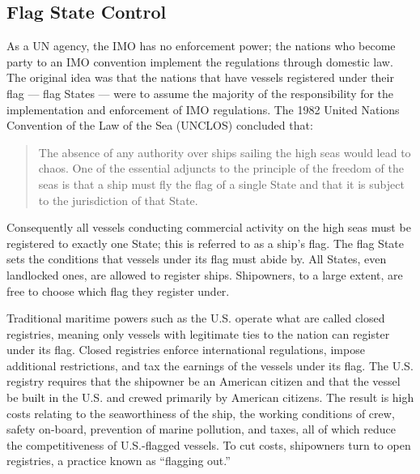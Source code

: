 \documentclass[twoside,symmetric,notoc]{tufte-book}
\begin{document}
\subsection{Flag State Control}
\par{%
As a UN agency, the IMO has no enforcement power; the nations who become party to an IMO convention implement the regulations through domestic law. The original idea was that the nations that have vessels registered under their  flag --- flag States --- were to assume the majority of the responsibility for the implementation and enforcement of IMO regulations.\cite{Joyner} The 1982 United Nations Convention of the Law of the Sea (UNCLOS) concluded that:\cite{UNCLOS}
\begin{quotation}
The absence of any authority over ships sailing the high seas would lead to chaos. One of the essential adjuncts to the principle of the freedom of the seas is that a ship must fly the flag of a single State and that it is subject to the jurisdiction of that State.
\end{quotation}
Consequently all vessels conducting commercial activity on the high seas must be registered to exactly one State; this is referred to as a ship's flag. The flag State sets the conditions that vessels under its flag must abide by. All States, even landlocked ones, are allowed to register ships. Shipowners, to a large extent, are free to choose which flag they register under.\cite{Mansell_class}
}
\par{%
Traditional maritime powers such as the U.S. operate what are called closed registries, meaning only vessels with legitimate ties to the nation can register under its flag. Closed registries enforce international regulations, impose additional restrictions, and tax the earnings of the vessels under its flag.\cite{Mukherjee} The U.S. registry requires that the shipowner be an American citizen and that the vessel be built in the U.S. and crewed primarily by American citizens.\cite{Papavizas} The result is high costs relating to the seaworthiness of the ship, the working conditions of crew, safety on-board, prevention of marine pollution, and taxes, all of which reduce the competitiveness of U.S.-flagged vessels.\cite{1960} To cut costs, shipowners turn to open registries, a practice known as ``flagging out.''\cite{Yannopoulos}
}
\end{document}
